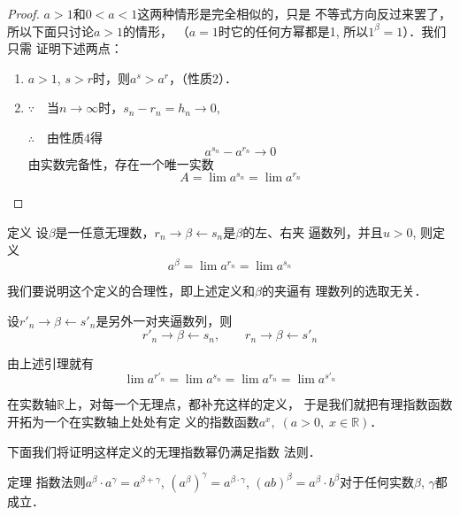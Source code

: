 \begin{proof}
  $a>1$和$0<a<1$这两种情形是完全相似的，只是
不等式方向反过来罢了，所以下面只讨论$a>1$的情形，
（$a=1$时它的任何方幂都是1, 所以$1^{\beta}=1$）．我们只需
证明下述两点：
\begin{enumerate}
  \item $a>1$, $s>r$时，则$a^s>a^r$，（性质2）．
  \item $\because\quad $当$n\to\infty$时，$s_n-r_n=h_n\to 0$,
  
  $\therefore\quad $由性质4得
\[  a^{s_n}-a^{r_n}\to 0\]
  由实数完备性，存在一个唯一实数
 \[ A=\lim a^{s_n}=\lim a^{r_n}\]
\end{enumerate}
\end{proof}

\begin{blk}{定义}
  设$\beta$是一任意无理数，$r_n\to\beta\leftarrow s_n$是$\beta$的左、右夹
逼数列，并且$u>0$, 则定义
\[a^{\beta}=\lim a^{r_n}=\lim a^{s_n}\]
\end{blk}


我们要说明这个定义的合理性，即上述定义和$\beta$的夹逼有
理数列的选取无关．

设$r'_n\to\beta\leftarrow s'_n$是另外一对夹逼数列，则
\[r'_n\to\beta \leftarrow s_n,\qquad r_n\to\beta\leftarrow s'_n\]

由上述引理就有
\[\lim a^{r'_n}=\lim a^{s_n}=\lim a^{r_n}=\lim a^{s'_n}\]

在实数轴$\mathbb{R}$上，对每一个无理点，都补充这样的定义，
于是我们就把有理指数函数开拓为一个在实数轴上处处有定
义的指数函数$a^x,\; (a>0,\; x\in\mathbb{R})$．

下面我们将证明这样定义的无理指数幂仍满足指数
法则．

\begin{blk}{定理}
  指数法则$a^{\beta}\cdot a^{\gamma}=a^{\beta+\gamma}$, $\left(a^{\beta}\right)^{\gamma}=a^{\beta\cdot \gamma}$, $(ab)^{\beta}=a^{\beta}\cdot b^{\beta}$对于任何实数$\beta$, $\gamma$都成立．
\end{blk}
 
